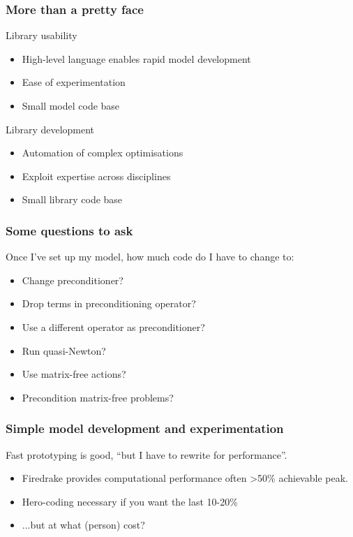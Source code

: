 \documentclass[presentation]{beamer}
\begin{document}
\begin{frame}
  \frametitle{More than a pretty face}

  \begin{block}{Library usability}
    \begin{itemize}
    \item High-level language enables rapid model development
    \item Ease of experimentation
    \item Small model code base
    \end{itemize}
  \end{block}

  \begin{block}{Library development}
    \begin{itemize}
    \item Automation of complex optimisations
    \item Exploit expertise across disciplines
    \item Small library code base
    \end{itemize}
  \end{block}
\end{frame}

\begin{frame}
  \frametitle{Some questions to ask}
  Once I've set up my model, how much code do I have to change to:

  \begin{itemize}
  \item Change preconditioner?
  \item Drop terms in preconditioning operator?
  \item Use a different operator as preconditioner?
  \item Run quasi-Newton?
  \item Use matrix-free actions?
  \item Precondition matrix-free problems?
  \end{itemize}
\end{frame}

\begin{frame}
  \frametitle{Simple model development and experimentation}
  Fast prototyping is good, ``but I have to rewrite for performance''.

  \begin{itemize}
  \item Firedrake provides computational performance often >50\% achievable
    peak.
  \item Hero-coding necessary if you want the last 10-20\%
  \item ...but at what (person) cost?
  \end{itemize}  
\end{frame}
\end{document}
